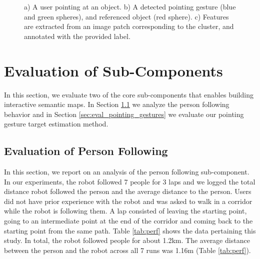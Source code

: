 \documentclass[3p]{elsarticle}
\begin{document}
\begin{figure}
\begin{center}
\begin{minipage}{160mm}
{}
\caption{a) A user pointing at an object. b) A detected pointing gesture
(blue and green spheres), and referenced object (red sphere). c) Features are
extracted from an image patch corresponding to the cluster, and annotated with the
provided label.} \label{fig:labeling_objects}
\end{minipage}
\end{center}
\end{figure}


\section{Evaluation of Sub-Components}
\label{sec:evaluation}

In this section, we evaluate two of the core sub-components that enables building interactive semantic maps. In Section \ref{sec:eval_person_following} we analyze the person following behavior and in Section \ref{sec:eval_pointing_gestures} we evaluate our pointing gesture target estimation method.

\subsection{Evaluation of Person Following}
\label{sec:eval_person_following}

In this section, we report on an analysis of the person following sub-component. In our experiments, the robot followed 7 people for 3 laps and we logged the total distance robot followed the person and the average distance to the person. Users did not have prior experience with the robot and was asked to walk in a corridor while the robot is following them. A lap consisted of leaving the starting point, going to an intermediate point at the end of the corridor and coming back to the starting point from the same path. Table \ref{tab:perf} shows the data pertaining this study. In total, the robot followed people for about 1.2km. The average distance between the person and the robot across all 7 runs was 1.16m (Table \ref{tab:perf}).
\end{document}
